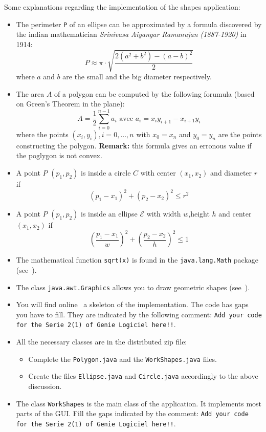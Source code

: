 Some explanations regarding the implementation of the shapes application:
\begin{itemize}
 \item The perimeter \texttt{P} of an ellipse can be approximated by a formula
discovered by the indian mathematician \emph{Srinivasa Aiyangar Ramanujan
(1887-1920)} in 1914:$$P\approx\pi\cdot\sqrt{\frac{2(a^2+b^2)-(a-b)^2}{2}}$$
where $a$ and $b$ are the small and the big diameter respectively.
\item The area $A$ of a polygon can be computed by the following forumula (based
on Green's Theorem in the plane):
$$A=\frac{1}{2}\sum_{i=0}^{n-1}a_i \text{ avec } a_i=x_iy_{i+1}-x_{i+1}y_i$$
where the points $(x_i, y_i), i=0,\ldots ,n$ with $x_0=x_n$ and $y_0=y_n$ are
the points constructing the polygon. \textbf{Remark:} this formula gives an
erronous value if the poglygon is not convex.
\item A point $P$ $(p_1,p_2)$ is inside a circle $C$ with center $(x_1, x_2)$ and diameter $r$ if
$$(p_1 - x_1)^2 + (p_2-x_2)^2 \leqslant r^2$$
\item A point $P$ $(p_1, p_2)$ is inside an ellipse $\mathcal{E}$ with width $w$,height $h$ and center $(x_1, x_2)$ if $$\left(\frac{p_1 - x_1}{w}\right)^2 + \left(\frac{p_2-x_2}{h}\right)^2 \leqslant 1$$
\item The mathematical function \texttt{sqrt(x)} is found in the \texttt{java.lang.Math} package (see~\cite{JAVAAPI}).
\item The class \texttt{java.awt.Graphics} allows you to draw geometric shapes (see~\cite{JAVAAPI}).
\item You will find online~\cite{WEBGL} a skeleton of the implementation. The code has gaps you have to fill. They are indicated by the following comment: \texttt{Add your code for the Serie 2(1) of Genie Logiciel here!!}.
\item All the necessary classes are in the distributed zip file:
\begin{itemize}
 \item Complete the \texttt{Polygon.java} and the \texttt{WorkShapes.java} files.
 \item Create the files \texttt{Ellipse.java} and \texttt{Circle.java} accordingly to the above discussion.
\end{itemize}
\item The class \texttt{WorkShapes} is the main class of the application. It implements most parts of the GUI. Fill the gaps indicated by the comment:
\texttt{Add your code for the Serie 2(1) of Genie Logiciel here!!}.

\end{itemize}
